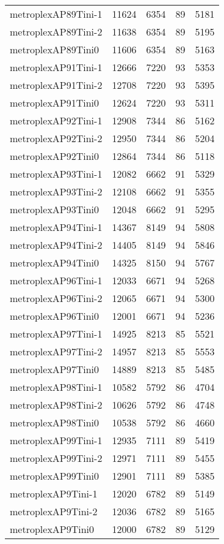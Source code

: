 \begin{longtable}{lrrrr}
metroplexAP89Tini-1 & 11624 & 6354 & 89 & 5181 \\
metroplexAP89Tini-2 & 11638 & 6354 & 89 & 5195 \\
metroplexAP89Tini0 & 11606 & 6354 & 89 & 5163 \\
metroplexAP91Tini-1 & 12666 & 7220 & 93 & 5353 \\
metroplexAP91Tini-2 & 12708 & 7220 & 93 & 5395 \\
metroplexAP91Tini0 & 12624 & 7220 & 93 & 5311 \\
metroplexAP92Tini-1 & 12908 & 7344 & 86 & 5162 \\
metroplexAP92Tini-2 & 12950 & 7344 & 86 & 5204 \\
metroplexAP92Tini0 & 12864 & 7344 & 86 & 5118 \\
metroplexAP93Tini-1 & 12082 & 6662 & 91 & 5329 \\
metroplexAP93Tini-2 & 12108 & 6662 & 91 & 5355 \\
metroplexAP93Tini0 & 12048 & 6662 & 91 & 5295 \\
metroplexAP94Tini-1 & 14367 & 8149 & 94 & 5808 \\
metroplexAP94Tini-2 & 14405 & 8149 & 94 & 5846 \\
metroplexAP94Tini0 & 14325 & 8150 & 94 & 5767 \\
metroplexAP96Tini-1 & 12033 & 6671 & 94 & 5268 \\
metroplexAP96Tini-2 & 12065 & 6671 & 94 & 5300 \\
metroplexAP96Tini0 & 12001 & 6671 & 94 & 5236 \\
metroplexAP97Tini-1 & 14925 & 8213 & 85 & 5521 \\
metroplexAP97Tini-2 & 14957 & 8213 & 85 & 5553 \\
metroplexAP97Tini0 & 14889 & 8213 & 85 & 5485 \\
metroplexAP98Tini-1 & 10582 & 5792 & 86 & 4704 \\
metroplexAP98Tini-2 & 10626 & 5792 & 86 & 4748 \\
metroplexAP98Tini0 & 10538 & 5792 & 86 & 4660 \\
metroplexAP99Tini-1 & 12935 & 7111 & 89 & 5419 \\
metroplexAP99Tini-2 & 12971 & 7111 & 89 & 5455 \\
metroplexAP99Tini0 & 12901 & 7111 & 89 & 5385 \\
metroplexAP9Tini-1 & 12020 & 6782 & 89 & 5149 \\
metroplexAP9Tini-2 & 12036 & 6782 & 89 & 5165 \\
metroplexAP9Tini0 & 12000 & 6782 & 89 & 5129 \\

\end{longtable}
